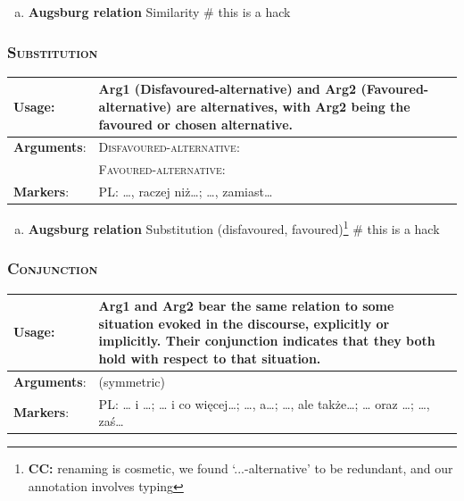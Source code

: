 \documentclass{udisc}
\newcommand{\noteCC}[1]{\footnote{{\textbf{CC:} {#1}}}}
\begin{document}
\begin{enumerate}[a)]
\item \textbf{Augsburg relation} Similarity
\nonstopmode # this is a hack
\end{enumerate}
\errorstopmode




\subsubsection{\textsc{Substitution}}

\begin{tabularx}{\textwidth}{|l|L|}
\hline

\textbf{Usage}:           &  Arg1 (Disfavoured-alternative) and Arg2 (Favoured-alternative) are alternatives, with
Arg2 being the favoured or chosen alternative. \\
\hline

\textbf{Arguments}:       &  \textsc{Disfavoured-alternative}: \\
                          &  \textsc{Favoured-alternative}: \\
\hline

\textbf{Markers}:         &  PL: …, raczej niż…; …, zamiast… \\
\hline

\end{tabularx}


\begin{enumerate}[a)]
\item \textbf{Augsburg relation} Substitution (disfavoured, favoured)\noteCC{renaming is cosmetic, we found `...-alternative' to be redundant, and our annotation involves typing}
\nonstopmode # this is a hack
\end{enumerate}
\errorstopmode


\subsubsection{\textsc{Conjunction}}

\begin{tabularx}{\textwidth}{|l|L|}
\hline

\textbf{Usage}:           &  Arg1 and Arg2 bear the same relation to some situation evoked in the discourse, explicitly or implicitly. Their conjunction indicates that they both hold with respect to that situation. \\
\hline

\textbf{Arguments}:       &  (symmetric) \\
\hline

\textbf{Markers}:        &  PL: … i …; … i co więcej…; …, a…; …, ale także…; … oraz …; …, zaś… \\
\hline

\end{tabularx}
\end{document}
